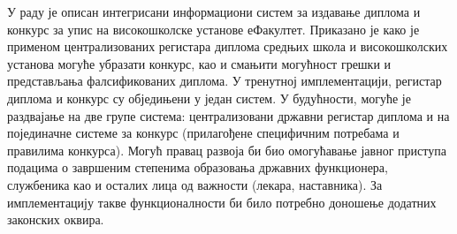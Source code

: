\documentclass[a4paper]{article}
\begin{document}
У раду је описан интегрисани информациони систем за издавање диплома и конкурс за упис на високошколске установе еФакултет.
Приказано је како је применом централизованих регистара диплома средњих школа и високошколских установа могуће убразати
конкурс, као и смањити могућност грешки и представљања фалсификованих диплома. У тренутној имплементацији, регистар диплома
и конкурс су обједињени у један систем. У будућности, могуће је раздвајање на две групе система:
централизовани државни регистар диплома и на појединачне системе за конкурс (прилагођене специфичним потребама и
правилима конкурса). Могућ правац развоја би био омогућавање јавног приступа подацима о завршеним степенима образовања
државних функционера, службеника као и осталих лица од важности (лекара, наставника). За имплементацију такве функционалности
би било потребно доношење додатних законских оквира.



\end{document}
